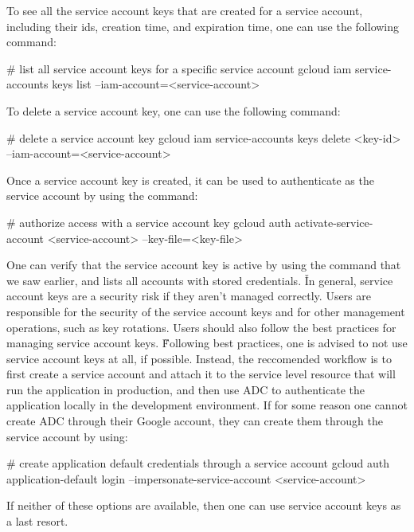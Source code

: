 To see all the service account keys that are created for a service account, including their ids, creation time, and
expiration time, one can use the following command:
\begin{bash}
# list all service account keys for a specific service account
gcloud iam service-accounts keys list --iam-account=<service-account>
\end{bash}

To delete a service account key, one can use the following command:
\begin{bash}
# delete a service account key
gcloud iam service-accounts keys delete <key-id> --iam-account=<service-account>
\end{bash}

Once a service account key is created, it can be used to authenticate as the service account by using the command:
\begin{bash}
# authorize access with a service account key
gcloud auth activate-service-account <service-account> --key-file=<key-file>
\end{bash}

One can verify that the service account key is active by using the  command that we saw earlier,
and lists all accounts with stored credentials. \v

In general, service account keys are a security risk if they aren't managed correctly. Users are responsible for the
security of the service account keys and for other management operations, such as key rotations. Users should also
follow the best practices for managing service account keys. \v

Following best practices, one is advised to not use service account keys at all, if possible. Instead, the reccomended
workflow is to first create a service account and attach it to the service level resource that will run the application
in production, and then use ADC to authenticate the application locally in the development environment. If for some
reason one cannot create ADC through their Google account, they can create them through the service account by using:
\begin{bash}
# create application default credentials through a service account
gcloud auth application-default login --impersonate-service-account <service-account>
\end{bash}

If neither of these options are available, then one can use service account keys as a last resort.

